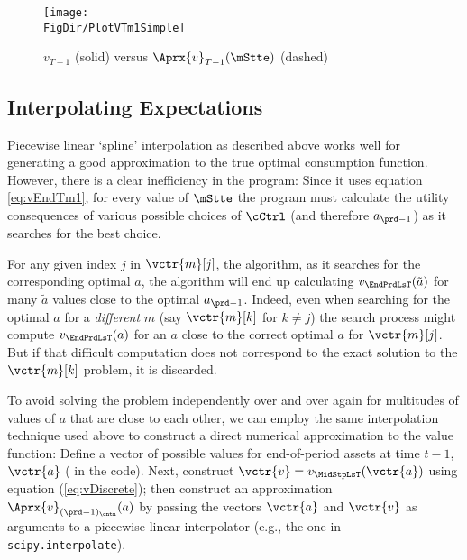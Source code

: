 \documentclass[titlepage, headings=optiontotocandhead]{Resources/texmf-local/tex/latex/econtex}
\begin{document}
\hypertarget{PlotvTm1Simple}{}
\begin{figure}
  \centerline{\texttt{[image: \\FigDir/PlotVTm1Simple]}}
  \caption{$v_{T-1}$ (solid) versus $\Aprx{v}_{T-1}(\mStte)$ (dashed)}
  \label{fig:PlotVTm1Simple}
\end{figure}


\hypertarget{interpolating-expectations}{}
\subsection{Interpolating Expectations}


Piecewise linear `spline' interpolation as described above works well for generating a good approximation to the true optimal consumption function. However, there is a clear inefficiency in the program: Since it uses equation \eqref{eq:vEndTm1}, for every value of $\mStte$ the program must calculate the utility consequences of various possible choices of $\cCtrl$ (and therefore $a_{\prd-1}$) as it searches for the best choice.

For any given index $j$ in $\vctr{m}[j]$, the algorithm, as it searches for the corresponding optimal $a$, the algorithm will end up  calculating $v_{\EndPrdLsT}(\tilde{a})$ for many $\tilde{a}$ values close to the optimal $a_{\prd-1}$.  Indeed, even when searching for the optimal $a$ for a \emph{different} $m$ (say $\vctr{m}[k]$ for $k \neq j$) the search process might compute $v_{\EndPrdLsT}(a)$ for an $a$ close to the correct optimal $a$ for $\vctr{m}[j]$. But if that difficult computation does not correspond to the exact solution to the $\vctr{m}[k]$ problem, it is discarded.  

To avoid solving the problem independently over and over again for multitudes of values of $a$ that are close to each other, we can employ the same interpolation technique used above to construct a direct numerical approximation to the value function: Define a vector of possible values for end-of-period assets at time $t-1$, $\vctr{a}$ ( in the code). Next, construct $\vctr{v} = v_{\MidStpLsT}(\vctr{a})$ using equation (\ref{eq:vDiscrete}); then construct an approximation $\Aprx{v}_{({\prd-1})_\cntn}(a)$ by passing the vectors $\vctr{a}$ and $\vctr{v}$ as arguments to a piecewise-linear interpolator (e.g., the one in \texttt{scipy.interpolate}).%
\end{document}
